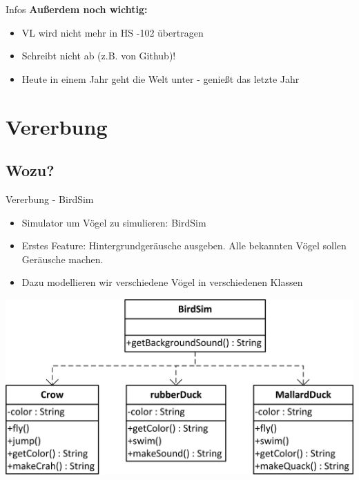 \documentclass[18pt]{beamer}
\begin{document}
\begin{frame}{Infos}
	\textbf{Außerdem noch wichtig:}
	\begin{itemize}
		\item VL wird nicht mehr in HS -102 übertragen\pause
		\item Schreibt nicht ab (z.B. von Github)!\pause
		\item Heute in einem Jahr geht die Welt unter - genießt das letzte Jahr\pause
	\end{itemize}
\end{frame}

\section{Vererbung}
\subsection{Wozu?}
\begin{frame}{Vererbung - BirdSim}
	\begin{itemize}
		\item Simulator um Vögel zu simulieren: BirdSim
		\item Erstes Feature: Hintergrundgeräusche ausgeben. Alle bekannten Vögel sollen Geräusche machen.
		\item Dazu modellieren wir verschiedene Vögel in verschiedenen Klassen
	\end{itemize}

	\pause
	\includegraphics[scale=1]{bilder/uml/uml1.jpg}
\end{frame}

\end{document}
